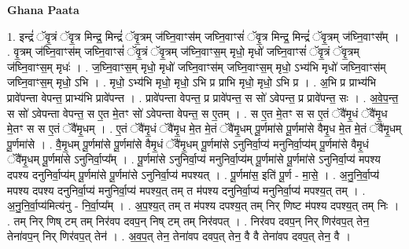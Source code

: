 \documentclass[17pt]{extarticle}
\begin{document}
\textbf{Ghana Paata } \newline

1. इन्द्रं॑ ॅवृ॒त्रं ॅवृ॒त्र मिन्द्र॒ मिन्द्रं॑ ॅवृ॒त्रम् ज॑घ्नि॒वाꣳस॑म् जघ्नि॒वाꣳसं॑ ॅवृ॒त्र मिन्द्र॒ मिन्द्रं॑ ॅवृ॒त्रम् ज॑घ्नि॒वाꣳस᳚म् । . वृ॒त्रम् ज॑घ्नि॒वाꣳस॑म् जघ्नि॒वाꣳसं॑ ॅवृ॒त्रं ॅवृ॒त्रम् ज॑घ्नि॒वाꣳस॒म् मृधो॒ मृधो॑ जघ्नि॒वाꣳसं॑ ॅवृ॒त्रं ॅवृ॒त्रम् ज॑घ्नि॒वाꣳस॒म् मृधः॑ । . ज॒घ्नि॒वाꣳस॒म् मृधो॒ मृधो॑ जघ्नि॒वाꣳस॑म् जघ्नि॒वाꣳस॒म् मृधो॒ ऽभ्य॑भि मृधो॑ जघ्नि॒वाꣳस॑म् जघ्नि॒वाꣳस॒म् मृधो॒ ऽभि । . मृधो॒ ऽभ्य॑भि मृधो॒ मृधो॒ ऽभि प्र प्राभि मृधो॒ मृधो॒ ऽभि प्र । . अ॒भि प्र प्राभ्य॑भि प्रावे॑पन्ता वेपन्त॒ प्राभ्य॑भि प्रावे॑पन्त । . प्रावे॑पन्ता वेपन्त॒ प्र प्रावे॑पन्त॒ स सो॑ ऽवेपन्त॒ प्र प्रावे॑पन्त॒ सः । . अ॒वे॒प॒न्त॒ स सो॑ ऽवेपन्ता वेपन्त॒ स ए॒त मे॒तꣳ सो॑ ऽवेपन्ता वेपन्त॒ स ए॒तम् । . स ए॒त मे॒तꣳ स स ए॒तं ॅवै॑मृ॒धं ॅवै॑मृ॒ध मे॒तꣳ स स ए॒तं ॅवै॑मृ॒धम् । . ए॒तं ॅवै॑मृ॒धं ॅवै॑मृ॒ध मे॒त मे॒तं ॅवै॑मृ॒धम् पू॒र्णमा॑से पू॒र्णमा॑से वैमृ॒ध मे॒त मे॒तं ॅवै॑मृ॒धम् पू॒र्णमा॑से । . वै॒मृ॒धम् पू॒र्णमा॑से पू॒र्णमा॑से वैमृ॒धं ॅवै॑मृ॒धम् पू॒र्णमा॑से ऽनुनिर्वा॒प्य॑ मनुनिर्वा॒प्य॑म् पू॒र्णमा॑से वैमृ॒धं ॅवै॑मृ॒धम् पू॒र्णमा॑से ऽनुनिर्वा॒प्य᳚म् । . पू॒र्णमा॑से ऽनुनिर्वा॒प्य॑ मनुनिर्वा॒प्य॑म् पू॒र्णमा॑से पू॒र्णमा॑से ऽनुनिर्वा॒प्य॑ मपश्य दपश्य दनुनिर्वा॒प्य॑म् पू॒र्णमा॑से पू॒र्णमा॑से ऽनुनिर्वा॒प्य॑ मपश्यत् । . पू॒र्णमा॑स॒ इति॑ पू॒र्ण - मा॒से॒ । . अ॒नु॒नि॒र्वा॒प्य॑ मपश्य दपश्य दनुनिर्वा॒प्य॑ मनुनिर्वा॒प्य॑ मपश्य॒त् तम् त म॑पश्य दनुनिर्वा॒प्य॑ मनुनिर्वा॒प्य॑ मपश्य॒त् तम् । . अ॒नु॒नि॒र्वा॒प्य॑मित्य॑नु - नि॒र्वा॒प्य᳚म् । . अ॒प॒श्य॒त् तम् त म॑पश्य दपश्य॒त् तम् निर् णिष्ट म॑पश्य दपश्य॒त् तम् निः । . तम् निर् णिष् टम् तम् निर॑वप दवप॒न् निष् टम् तम् निर॑वपत् । . निर॑वप दवप॒न् निर् णिर॑वप॒त् तेन॒ तेना॑वप॒न् निर् णिर॑वप॒त् तेन॑ । . अ॒व॒प॒त् तेन॒ तेना॑वप दवप॒त् तेन॒ वै वै तेना॑वप दवप॒त् तेन॒ वै । \newline
\end{document}
